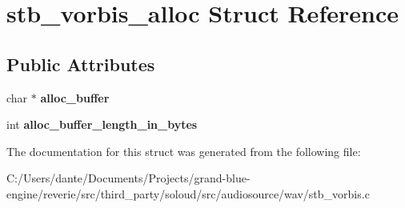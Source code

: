 \hypertarget{structstb__vorbis__alloc}{}\section{stb\+\_\+vorbis\+\_\+alloc Struct Reference}
\label{structstb__vorbis__alloc}
\subsection*{Public Attributes}
\begin{DoxyCompactItemize}
\item 
\mbox{\label{structstb__vorbis__alloc_a0bb516f56fb154f942d7c8641d33a26e}} 
char $\ast$ {\bfseries alloc\+\_\+buffer}
\item 
\mbox{\label{structstb__vorbis__alloc_a04baf605f33de80c7161b27fb2ec5d86}} 
int {\bfseries alloc\+\_\+buffer\+\_\+length\+\_\+in\+\_\+bytes}
\end{DoxyCompactItemize}


The documentation for this struct was generated from the following file\+:\begin{DoxyCompactItemize}
\item 
C\+:/\+Users/dante/\+Documents/\+Projects/grand-\/blue-\/engine/reverie/src/third\+\_\+party/soloud/src/audiosource/wav/stb\+\_\+vorbis.\+c\end{DoxyCompactItemize}
